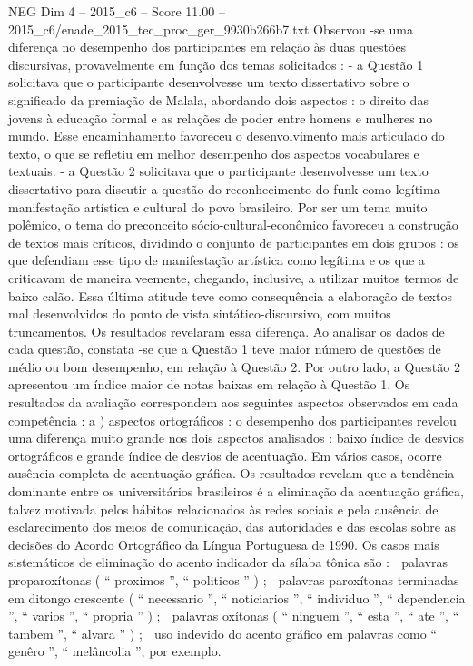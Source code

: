 \begin{textsample}{NEG Dim 4 – 2015\_c6 – Score 11.00 – 2015\_c6/enade\_2015\_tec\_proc\_ger\_9930b266b7.txt}
Observou -se uma diferença no desempenho dos participantes em relação às duas questões discursivas, provavelmente em função dos temas solicitados : - a Questão 1 solicitava que o participante desenvolvesse um texto dissertativo sobre o significado da premiação de Malala, abordando dois aspectos : o direito das jovens à educação formal e as relações de poder entre homens e mulheres no mundo.
Esse encaminhamento favoreceu o desenvolvimento mais articulado do texto, o que se refletiu em melhor desempenho dos aspectos vocabulares e textuais. - a Questão 2 solicitava que o participante desenvolvesse um texto dissertativo para discutir a questão do reconhecimento do funk como legítima manifestação artística e cultural do povo brasileiro.
Por ser um tema muito polêmico, o tema do preconceito sócio-cultural-econômico favoreceu a construção de textos mais críticos, dividindo o conjunto de participantes em dois grupos : os que defendiam esse tipo de manifestação artística como legítima e os que a criticavam de maneira veemente, chegando, inclusive, a utilizar muitos termos de baixo calão.
Essa última atitude teve como consequência a elaboração de textos mal desenvolvidos do ponto de vista sintático-discursivo, com muitos truncamentos.
Os resultados revelaram essa diferença.
Ao analisar os dados de cada questão, constata -se que a Questão 1 teve maior número de questões de médio ou bom desempenho, em relação à Questão 2.
Por outro lado, a Questão 2 apresentou um índice maior de notas baixas em relação à Questão 1.
Os resultados da avaliação correspondem aos seguintes aspectos observados em cada competência : a ) aspectos ortográficos : o desempenho dos participantes revelou uma diferença muito grande nos dois aspectos analisados : baixo índice de desvios ortográficos e grande índice de desvios de acentuação.
Em vários casos, ocorre ausência completa de acentuação gráfica.
Os resultados revelam que a tendência dominante entre os universitários brasileiros é a eliminação da acentuação gráfica, talvez motivada pelos hábitos relacionados às redes sociais e pela ausência de esclarecimento dos meios de comunicação, das autoridades e das escolas sobre as decisões do Acordo Ortográfico da Língua Portuguesa de 1990.
Os casos mais sistemáticos de eliminação do acento indicador da sílaba tônica são :  palavras proparoxítonas ( “ proximos ”, “ politicos ” ) ;  palavras paroxítonas terminadas em ditongo crescente ( “ necessario ”, “ noticiarios ”, “ individuo ”, “ dependencia ”, “ varios ”, “ propria ” ) ;  palavras oxítonas ( “ ninguem ”, “ esta ”, “ ate ”, “ tambem ”, “ alvara ” ) ;  uso indevido do acento gráfico em palavras como “ genêro ”, “ melâncolia ”, por exemplo.

\end{textsample}
